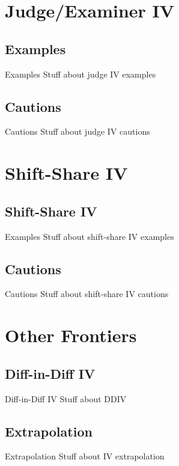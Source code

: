 \documentclass{beamer}
\begin{document}

\section{Judge/Examiner IV}

\subsection{Examples}
\begin{frame}{Examples}
Stuff about judge IV examples
\end{frame}

\subsection{Cautions}
\begin{frame}{Cautions}
Stuff about judge IV cautions
\end{frame}

\section{Shift-Share IV}

\subsection{Shift-Share IV}
\begin{frame}{Examples}
Stuff about shift-share IV examples
\end{frame}

\subsection{Cautions}
\begin{frame}{Cautions}
Stuff about shift-share IV cautions
\end{frame}

\section{Other Frontiers}

\subsection{Diff-in-Diff IV}
\begin{frame}{Diff-in-Diff IV}
Stuff about DDIV
\end{frame}

\subsection{Extrapolation}
\begin{frame}{Extrapolation}
Stuff about IV extrapolation
\end{frame}
\end{document}

